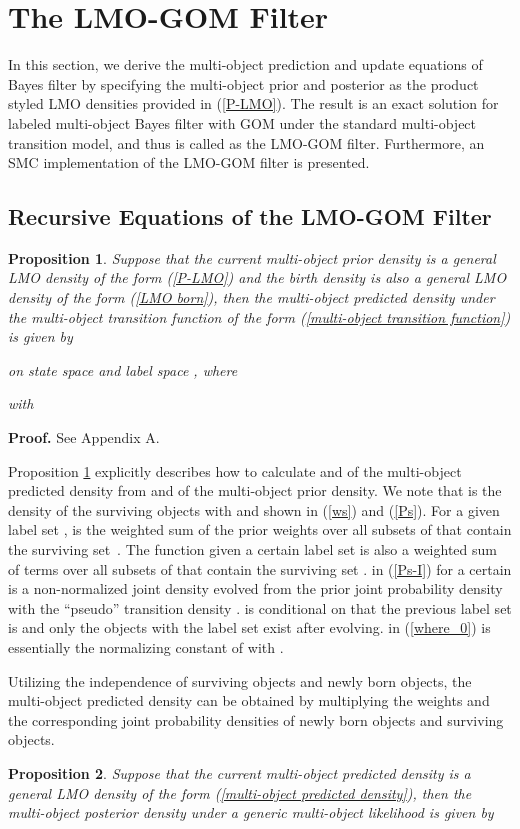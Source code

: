 \documentclass[journal]{IEEEtran}
\newtheorem{Pro}{Proposition}
\newcommand{\proproof}[1]{\noindent\textbf{Proof. } See Appendix #1.}
\begin{document}
{\section{The LMO-GOM Filter}\label{chp:4}
In this section, we derive the multi-object prediction and update equations of Bayes filter by specifying the multi-object prior and posterior as the product styled LMO densities provided in (\ref{P-LMO}). The result is an exact solution for labeled multi-object  Bayes filter with GOM under the standard multi-object transition model, and thus is called as  the  LMO-GOM filter. Furthermore, an SMC implementation of the LMO-GOM filter is presented. 
\subsection{Recursive Equations of the LMO-GOM Filter}
\begin{Pro}\label{pro:1}
Suppose that  the current multi-object prior density is a general LMO density of the form  (\ref{P-LMO})
and the birth density is also a general LMO density of the form (\ref{LMO born}),
then the multi-object predicted density under the multi-object transition function of the form (\ref{multi-object transition function}) is given by

on state space  and label space ,
where

with
 

\end{Pro}

\proproof{A}

Proposition \ref{pro:1} explicitly describes how to calculate   and   of the  multi-object predicted density from   and  of the multi-object  prior  density. We note that  is  the density of the surviving objects with  and   shown in (\ref{ws}) and (\ref{Ps}).  For a  given label set ,  is the weighted sum  of the prior weights  over all subsets of  that contain the surviving set~.  
The function  given a certain  label set   is also a weighted sum of  terms over all subsets of   that contain the surviving set . 
  in (\ref{Ps-I})  for a certain  is a non-normalized joint density evolved from the prior joint probability density   with the ``pseudo'' transition density .   is conditional on that the previous label set is  and  only the objects with the label set  exist after evolving.  in (\ref{where_0}) is essentially the normalizing constant of  with .

Utilizing the independence of surviving objects and newly born objects, the multi-object predicted density can be obtained by multiplying   the weights  and the corresponding joint probability densities of newly born objects and surviving objects.
\begin{Pro}\label{pro:2}
Suppose that the current multi-object predicted density is a general LMO density of the form (\ref{multi-object predicted density}), then the multi-object posterior density under a generic multi-object likelihood  is given by


\end{Pro}}
\end{document}
